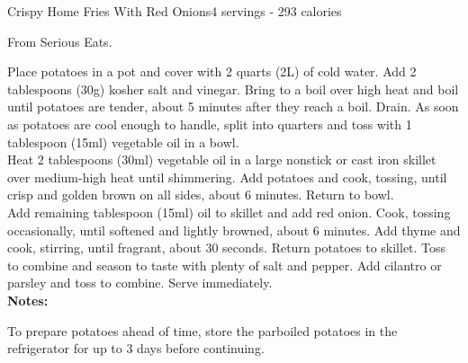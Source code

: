 \begin{recipe}{Crispy Home Fries With Red Onions}{4 servings - 293 calories}{}

\freeform From Serious Eats.


Place potatoes in a pot and cover with 2 quarts (2L) of cold water. Add 2 tablespoons (30g) kosher salt and vinegar. Bring to a boil over high heat and boil until potatoes are tender, about 5 minutes after they reach a boil. Drain. As soon as potatoes are cool enough to handle, split into quarters and toss with 1 tablespoon (15ml) vegetable oil in a bowl.\\

Heat 2 tablespoons (30ml) vegetable oil in a large nonstick or cast iron skillet over medium-high heat until shimmering. Add potatoes and cook, tossing, until crisp and golden brown on all sides, about 6 minutes. Return to bowl.\\

Add remaining tablespoon (15ml) oil to skillet and add red onion. Cook, tossing occasionally, until softened and lightly browned, about 6 minutes. Add thyme and cook, stirring, until fragrant, about 30 seconds. Return potatoes to skillet. Toss to combine and season to taste with plenty of salt and pepper. Add cilantro or parsley and toss to combine. Serve immediately.\\

\textbf{Notes:}

To prepare potatoes ahead of time, store the parboiled potatoes in the refrigerator for up to 3 days before continuing.

\end{recipe}